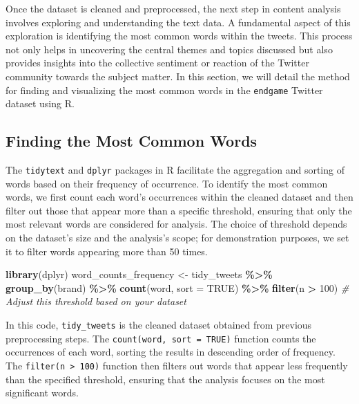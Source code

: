 \documentclass[
]{book}
\newenvironment{Shaded}{\begin{snugshade}}{\end{snugshade}}
\newcommand{\AttributeTok}[1]{\textcolor[rgb]{0.13,0.29,0.53}{#1}}
\newcommand{\CommentTok}[1]{\textcolor[rgb]{0.56,0.35,0.01}{\textit{#1}}}
\newcommand{\ConstantTok}[1]{\textcolor[rgb]{0.56,0.35,0.01}{#1}}
\newcommand{\DecValTok}[1]{\textcolor[rgb]{0.00,0.00,0.81}{#1}}
\newcommand{\FunctionTok}[1]{\textcolor[rgb]{0.13,0.29,0.53}{\textbf{#1}}}
\newcommand{\NormalTok}[1]{#1}
\newcommand{\OtherTok}[1]{\textcolor[rgb]{0.56,0.35,0.01}{#1}}
\newcommand{\SpecialCharTok}[1]{\textcolor[rgb]{0.81,0.36,0.00}{\textbf{#1}}}
\begin{document}
Once the dataset is cleaned and preprocessed, the next step in content analysis involves exploring and understanding the text data. A fundamental aspect of this exploration is identifying the most common words within the tweets. This process not only helps in uncovering the central themes and topics discussed but also provides insights into the collective sentiment or reaction of the Twitter community towards the subject matter. In this section, we will detail the method for finding and visualizing the most common words in the \texttt{endgame} Twitter dataset using R.

\hypertarget{finding-the-most-common-words}{%
\subsection{Finding the Most Common Words}\label{finding-the-most-common-words}}

The \texttt{tidytext} and \texttt{dplyr} packages in R facilitate the aggregation and sorting of words based on their frequency of occurrence. To identify the most common words, we first count each word's occurrences within the cleaned dataset and then filter out those that appear more than a specific threshold, ensuring that only the most relevant words are considered for analysis. The choice of threshold depends on the dataset's size and the analysis's scope; for demonstration purposes, we set it to filter words appearing more than 50 times.

\begin{Shaded}
\begin{Highlighting}[]
\FunctionTok{library}\NormalTok{(dplyr)}
\NormalTok{word\_counts\_frequency }\OtherTok{\textless{}{-}}\NormalTok{ tidy\_tweets }\SpecialCharTok{\%\textgreater{}\%}
  \FunctionTok{group\_by}\NormalTok{(brand) }\SpecialCharTok{\%\textgreater{}\%}
  \FunctionTok{count}\NormalTok{(word, }\AttributeTok{sort =} \ConstantTok{TRUE}\NormalTok{) }\SpecialCharTok{\%\textgreater{}\%}
  \FunctionTok{filter}\NormalTok{(n }\SpecialCharTok{\textgreater{}} \DecValTok{100}\NormalTok{) }\CommentTok{\# Adjust this threshold based on your dataset}
\end{Highlighting}
\end{Shaded}

In this code, \texttt{tidy\_tweets} is the cleaned dataset obtained from previous preprocessing steps. The \texttt{count(word,\ sort\ =\ TRUE)} function counts the occurrences of each word, sorting the results in descending order of frequency. The \texttt{filter(n\ \textgreater{}\ 100)} function then filters out words that appear less frequently than the specified threshold, ensuring that the analysis focuses on the most significant words.
\end{document}
